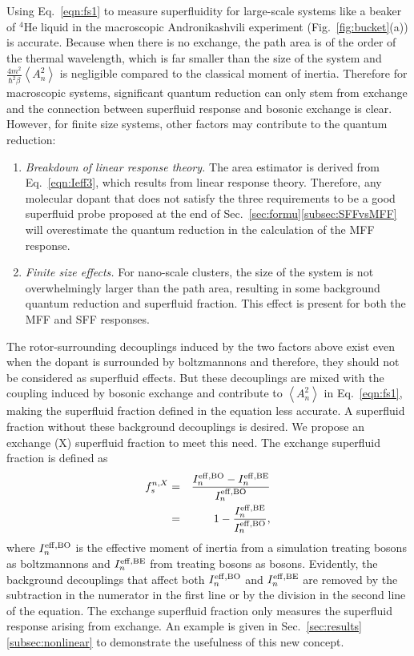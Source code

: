 \documentclass[12pt]{iopart}
\begin{document}
Using Eq.~\ref{eqn:fs1} to measure superfluidity for large-scale systems like a beaker of $^4$He liquid in the macroscopic Andronikashvili experiment (Fig.~\ref{fig:bucket}(a)) is accurate. Because when there is no exchange, the path area is of the order of the thermal wavelength, which is far smaller than the size of the system and $\frac{4m^2}{\hbar^2\beta}\left<A^2_n\right>$ is negligible compared to the classical moment of inertia. Therefore for macroscopic systems, significant quantum reduction can only stem from exchange and the connection between superfluid response and bosonic exchange is clear. However, for finite size systems, other factors may contribute to the quantum reduction:
\begin{enumerate}
\item {\em Breakdown of  linear response theory.} The area estimator is derived from Eq.~\ref{eqn:Ieff3}, which results from  linear response theory. Therefore, any molecular dopant that does not satisfy the three requirements to be a good superfluid probe proposed at the end of Sec.~\ref{sec:formu}\ref{subsec:SFFvsMFF} will overestimate the quantum reduction in the calculation of the MFF response.

\item {\em Finite size effects.} For nano-scale clusters, the size of the system is not overwhelmingly larger than the path area, resulting in some background quantum reduction and superfluid fraction. This effect is present for both the MFF and SFF responses.

\end{enumerate}

The rotor-surrounding decouplings induced by the two factors above exist even when the dopant is surrounded by boltzmannons and therefore, they should not be considered as superfluid effects. 
But these decouplings are mixed with the coupling induced by bosonic exchange and contribute to $\left< A_n^2 \right>$ in Eq.~\ref{eqn:fs1}, making the superfluid fraction defined in the equation less accurate. 
A superfluid fraction without these background decouplings is desired. 
We propose an exchange (X) superfluid fraction to meet this need. 
The exchange superfluid fraction is defined as
\begin{eqnarray}
f_s^{n,X}&=&\frac{I_n^{\rm eff,BO}-I_n^{\rm eff,BE}}{I_n^{\rm eff,BO}}\nonumber\\
&=&1-\frac{I_n^{\rm eff,BE}}{I_n^{\rm eff,BO}},
\end{eqnarray}
where $I_n^{\rm eff,BO}$ is the effective moment of inertia from a simulation treating bosons as boltzmannons and $I_n^{\rm eff,BE}$ from treating bosons as bosons. 
Evidently, the background decouplings that affect both $I_n^{\rm eff,BO}$ and $I_n^{\rm eff,BE}$ are removed by the subtraction in the numerator in the first line or by the division in the second line of the equation. 
The exchange superfluid fraction only measures the superfluid response arising from exchange. 
An example is given in Sec.~\ref{sec:results}\ref{subsec:nonlinear} to demonstrate the usefulness of this new concept.
\end{document}
